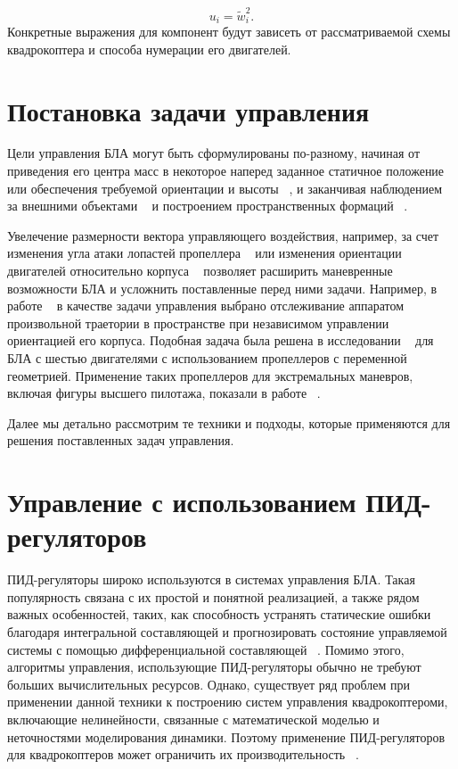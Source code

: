   	\begin{equation} \label{eq:common_control_vector}
u_i = \tilde{w}_i^2.
  	\end{equation}
 Конкретные выражения для компонент будут зависеть от рассматриваемой схемы квадрокоптера и способа нумерации его двигателей.
 
 \section{Постановка задачи управления}
 Цели управления БЛА могут быть сформулированы по-разному,
 начиная от приведения его центра масс в некоторое наперед заданное статичное положение
 ~\cite{Huynh01, Yuskin01}
 или обеспечения требуемой ориентации и высоты
 ~\cite{Domingos01, Wang01, Gheorghita01, Lukmana01, Zabko01},
 и заканчивая наблюдением за внешними объектами
 ~\cite{Rodriguez01, Kendall01, Razinkova01}
 и построением пространственных формаций
 ~\cite{Ali01, Zhao01, Preiss01}.
 
 Увелечение размерности вектора управляющего воздействия, например, за счет изменения угла атаки лопастей пропеллера ~\cite{Cutler01, Cutler02}  или изменения ориентации двигателей относительно корпуса ~\cite{Sridhar02, Kumar02} позволяет расширить маневренные возможности БЛА и усложнить поставленные перед ними задачи. Например, в работе ~\cite{Ryll02} в качестве задачи управления выбрано отслеживание аппаратом произвольной траетории в пространстве при независимом управлении ориентацией его корпуса. Подобная задача была решена в исследовании ~\cite{Kaufman01} для БЛА с шестью двигателями с использованием пропеллеров с переменной геометрией. Применение таких пропеллеров для экстремальных маневров, включая фигуры высшего пилотажа, показали в работе ~\cite{Cutler02}.
 
 Далее мы детально рассмотрим те техники и подходы, которые применяются для решения поставленных задач управления. 

\section{Управление с использованием ПИД-регуляторов}

ПИД-регуляторы широко используются в системах управления БЛА.
Такая популярность связана с их простой и понятной реализацией, а также рядом важных особенностей, таких, как способность устранять статические ошибки благодаря интегральной составляющей и прогнозировать состояние управляемой системы с помощью дифференциальной составляющей  ~\cite{Astrom01}.
Помимо этого, алгоритмы управления, использующие ПИД-регуляторы обычно не требуют больших вычислительных ресурсов.
Однако, существует ряд проблем при применении данной техники к построению систем управления квадрокоптероми, включающие нелинейности, связанные с математической моделью и неточностями моделирования динамики.
Поэтому применение ПИД-регуляторов для квадрокоптеров может ограничить их производительность ~\cite{Zulu01}.

